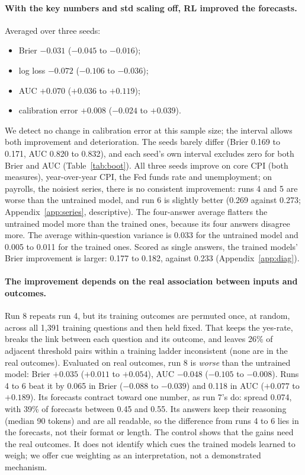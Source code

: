\documentclass[11pt]{article}
\begin{document}
\par\medskip\noindent\begin{minipage}{\linewidth}
\paragraph{With the key numbers and std scaling off, RL improved the forecasts.} Averaged over three seeds:
\begin{itemize}[leftmargin=*]
\item Brier $-0.031$ ($-0.045$ to $-0.016$);
\item log loss $-0.072$ ($-0.106$ to $-0.036$);
\item AUC $+0.070$ ($+0.036$ to $+0.119$);
\item calibration error $+0.008$ ($-0.024$ to $+0.039$).
\end{itemize}
\end{minipage}\par\medskip
We detect no change in calibration error at this sample size; the interval allows both improvement and deterioration. The seeds barely differ (Brier 0.169 to 0.171, AUC 0.820 to 0.832), and each seed's own interval excludes zero for both Brier and AUC (Table~\ref{tab:boot}). All three seeds improve on core CPI (both measures), year-over-year CPI, the Fed funds rate and unemployment; on payrolls, the noisiest series, there is no consistent improvement: runs 4 and 5 are worse than the untrained model, and run 6 is slightly better (0.269 against 0.273; Appendix~\ref{app:series}, descriptive). The four-answer average flatters the untrained model more than the trained ones, because its four answers disagree more. The average within-question variance is 0.033 for the untrained model and 0.005 to 0.011 for the trained ones. Scored as single answers, the trained models' Brier improvement is larger: 0.177 to 0.182, against 0.233 (Appendix~\ref{app:diag}).

\paragraph{The improvement depends on the real association between inputs and outcomes.} Run 8 repeats run 4, but its training outcomes are permuted once, at random, across all 1,391 training questions and then held fixed. That keeps the yes-rate, breaks the link between each question and its outcome, and leaves 26\% of adjacent threshold pairs within a training ladder inconsistent (none are in the real outcomes). Evaluated on real outcomes, run 8 is \emph{worse} than the untrained model: Brier $+0.035$ ($+0.011$ to $+0.054$), AUC $-0.048$ ($-0.105$ to $-0.008$). Runs 4 to 6 beat it by 0.065 in Brier ($-0.088$ to $-0.039$) and 0.118 in AUC ($+0.077$ to $+0.189$). Its forecasts contract toward one number, as run 7's do: spread 0.074, with 39\% of forecasts between 0.45 and 0.55. Its answers keep their reasoning (median 90 tokens) and are all readable, so the difference from runs 4 to 6 lies in the forecasts, not their format or length. The control shows that the gains need the real outcomes. It does not identify which cues the trained models learned to weigh; we offer cue weighting as an interpretation, not a demonstrated mechanism.
\end{document}
